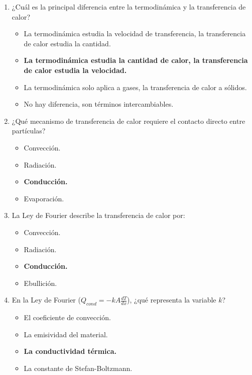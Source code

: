 \documentclass{article}
\begin{document}
\begin{enumerate}[label=\arabic*.]

    \item ¿Cuál es la principal diferencia entre la termodinámica y la transferencia de calor?
    \begin{itemize}[label=\alph*)]
        \item La termodinámica estudia la velocidad de transferencia, la transferencia de calor estudia la cantidad.
        \item \textbf{La termodinámica estudia la cantidad de calor, la transferencia de calor estudia la velocidad.}
        \item La termodinámica solo aplica a gases, la transferencia de calor a sólidos.
        \item No hay diferencia, son términos intercambiables.
    \end{itemize}

    \item ¿Qué mecanismo de transferencia de calor requiere el contacto directo entre partículas?
    \begin{itemize}[label=\alph*)]
        \item Convección.
        \item Radiación.
        \item \textbf{Conducción.}
        \item Evaporación.
    \end{itemize}

    \item La Ley de Fourier describe la transferencia de calor por:
    \begin{itemize}[label=\alph*)]
        \item Convección.
        \item Radiación.
        \item \textbf{Conducción.}
        \item Ebullición.
    \end{itemize}

    \item En la Ley de Fourier ($Q_{cond} = -k A \frac{dT}{dx}$), ¿qué representa la variable $k$?
    \begin{itemize}[label=\alph*)]
        \item El coeficiente de convección.
        \item La emisividad del material.
        \item \textbf{La conductividad térmica.}
        \item La constante de Stefan-Boltzmann.
    \end{itemize}


\end{enumerate}
\end{document}
